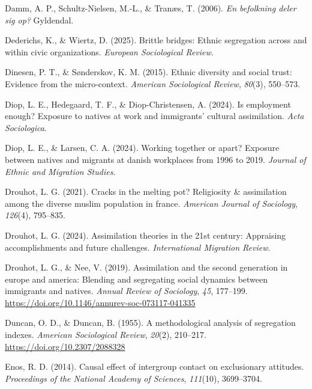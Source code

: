 \documentclass[
]{book}
\newlength{\cslhangindent}
\newenvironment{CSLReferences}[2] %
 {\begin{list}{}{%
  \setlength{\itemindent}{0pt}
  \setlength{\leftmargin}{0pt}
  \setlength{\parsep}{0pt}
  \ifodd #1
   \setlength{\leftmargin}{\cslhangindent}
   \setlength{\itemindent}{-1\cslhangindent}
  \fi
  \setlength{\itemsep}{#2\baselineskip}}}
 {\end{list}}
\begin{document}
\begin{CSLReferences}{1}{0}
Damm, A. P., Schultz-Nielsen, M.-L., \& Tranæs, T. (2006). \emph{En befolkning deler sig op?} Gyldendal.

Dederichs, K., \& Wiertz, D. (2025). Brittle bridges: Ethnic segregation across and within civic organizations. \emph{European Sociological Review}.

Dinesen, P. T., \& Sønderskov, K. M. (2015). Ethnic diversity and social trust: Evidence from the micro-context. \emph{American Sociological Review}, \emph{80}(3), 550--573.

Diop, L. E., Hedegaard, T. F., \& Diop-Christensen, A. (2024). Is employment enough? Exposure to natives at work and immigrants' cultural assimilation. \emph{Acta Sociologica}.

Diop, L. E., \& Larsen, C. A. (2024). Working together or apart? Exposure between natives and migrants at danish workplaces from 1996 to 2019. \emph{Journal of Ethnic and Migration Studies}.

Drouhot, L. G. (2021). Cracks in the melting pot? Religiosity \& assimilation among the diverse muslim population in france. \emph{American Journal of Sociology}, \emph{126}(4), 795--835.

Drouhot, L. G. (2024). Assimilation theories in the 21st century: Appraising accomplishments and future challenges. \emph{International Migration Review}.

Drouhot, L. G., \& Nee, V. (2019). Assimilation and the second generation in europe and america: Blending and segregating social dynamics between immigrants and natives. \emph{Annual Review of Sociology}, \emph{45}, 177--199. \url{https://doi.org/10.1146/annurev-soc-073117-041335}

Duncan, O. D., \& Duncan, B. (1955). A methodological analysis of segregation indexes. \emph{American Sociological Review}, \emph{20}(2), 210--217. \url{https://doi.org/10.2307/2088328}

Enos, R. D. (2014). Causal effect of intergroup contact on exclusionary attitudes. \emph{Proceedings of the National Academy of Sciences}, \emph{111}(10), 3699--3704.


\end{CSLReferences}
\end{document}
